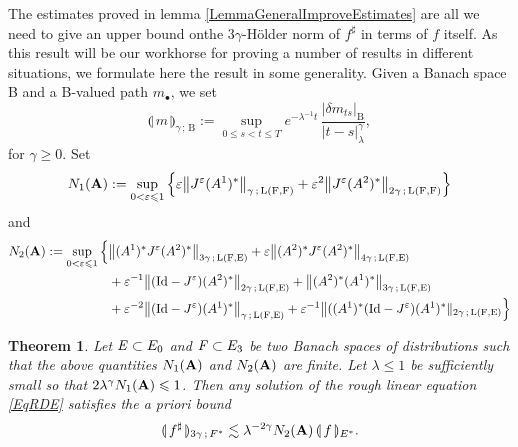 \documentclass[11pt,a4paper]{amsart}
\renewcommand{\leq}{\leqslant}
\renewcommand{\geq}{\geqslant}
\newcommand{\ssk}{\smallskip}
\newtheorem{thm}{\hspace{-0.15cm}  {\sc Theorem} } %
\numberwithin{equation}{section} %
\begin{document}
\medskip

The estimates proved in lemma \ref{LemmaGeneralImproveEstimates} are all we need to give an upper bound onthe $3\gamma$-H\"older norm of $f^\sharp$ in terms of $f$ itself. As this result will be our workhorse for proving a number of results in different situations, we formulate here the result in some generality. Given a Banach space B and a B-valued path $m_\bullet$, we set
$$
\llparenthesis\,m\,\rrparenthesis_{\gamma\,;\,\textrm{B}} := \sup_{0\leq s<t\leq T}e^{-\lambda^{-1}t}\,\frac{\big| \delta m_{ts} \big|_\textrm{B}}{|t-s|^\gamma_\lambda},
$$
for $\gamma\geq 0$. Set 
$$
N_1({\bfA}) := \sup_{0<\varepsilon\leq 1} \Big\{ \varepsilon\big\| J^\varepsilon (A^1)^*\big\|_{\gamma\,;\,\textrm{L}(\textrm{F},\textrm{F})} + \varepsilon^2\big\| J^\varepsilon (A^2)^*\big\|_{2\gamma\,;\,\textrm{L}(\textrm{F},\textrm{F})} \Big\}
$$ 
and
\begin{equation*}
\begin{split}
N_2({\bfA}) := \sup_{0<\varepsilon\leq 1}  \Big\{ &  \big\|(A^1)^* J^\varepsilon  (A^2)^*\big\|_{3\gamma\,;\,\textrm{L}(\textrm{F},\textrm{E})} + \varepsilon \big\|(A^2)^* J^\varepsilon  (A^2)^*\big\|_{4\gamma\,;\,\textrm{L}(\textrm{F},\textrm{E})} \\
&+ \varepsilon^{-1}  \big\|(\textrm{Id} - J^\varepsilon) (A^2)^*\big\|_{2\gamma\,;\,\textrm{L}(\textrm{F},\textrm{E})} + \big\|(A^2) ^* (A^1)^*\big\|_{3\gamma\,;\,\textrm{L}(\textrm{F},\textrm{E})} \\
&+ \varepsilon^{-2} \big\|(\textrm{Id} - J^\varepsilon) (A^1)^*\big\|_{\gamma\,;\,\textrm{L}(\textrm{F},\textrm{E})} + \varepsilon^{-1}\big\|((A^1)^*(\textrm{Id} - J^\varepsilon) (A^1)^*\|_{2\gamma\,;\,\textrm{L}(\textrm{F},\textrm{E})} \Big\}
\end{split}
\end{equation*}

\ssk

\begin{thm}
\label{ThmGeneralRegularityGain} 
Let $\textrm{\emph{E}}\subset E_0$ and $\textrm{\emph{F}}\subset E_3$ be two Banach spaces of distributions such that the above quantities $N_1({\bf A})$ and $N_2({\bf A})$ are finite. Let  $\lambda \le 1$ be sufficiently small so that $2\lambda^{\gamma} N_1({\bfA}) \leq 1$. Then any solution of the rough linear equation \eqref{EqRDE} satisfies the a priori bound 
$$
\llparenthesis\, f^\sharp\,\rrparenthesis_{3\gamma\,;\,F^*} \lesssim \lambda^{-2\gamma} N_2({\bf A})\,\llparenthesis\,f\,\rrparenthesis_{E^*}. 
$$
\end{thm}
\end{document}
